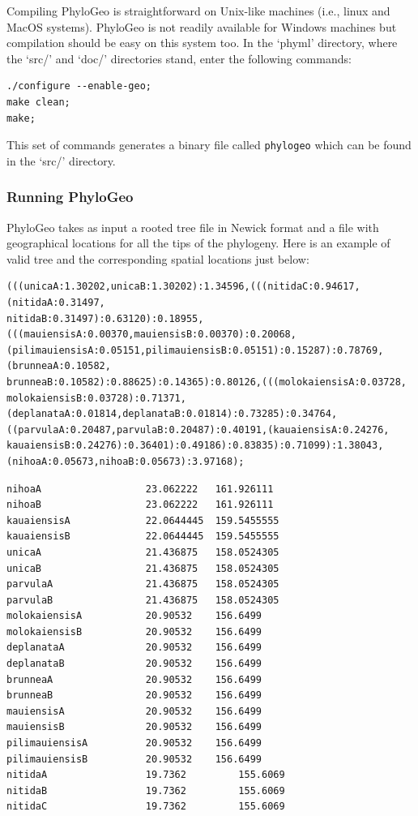 \documentclass[a4paper,12pt]{article}
\newcommand{\x}[1]{\texttt{#1}}
\begin{document}
Compiling PhyloGeo is straightforward on Unix-like  machines (i.e., linux and MacOS systems). PhyloGeo
is not readily available for Windows machines but  compilation should be easy on this system too. In
the `phyml' directory, where the `src/'  and `doc/' directories stand, enter the following commands:
{\setlength{\baselineskip}{0.5\baselineskip}
\begin{verbatim}
./configure --enable-geo;
make clean;
make;
\end{verbatim} } This set of commands generates  a binary file called \x{phylogeo} which can be found
  in the `src/' directory.

\subsubsection{Running PhyloGeo} PhyloGeo takes as input a rooted tree file in Newick format and a file
with geographical locations for all the tips of the phylogeny. Here is an example of valid tree and
the corresponding spatial locations just below:


\begin{scriptsize}
\begin{Verbatim}[frame=single, label=Valid PhyloGeo input tree, samepage=true, baselinestretch=0.5]
(((unicaA:1.30202,unicaB:1.30202):1.34596,(((nitidaC:0.94617,(nitidaA:0.31497,
nitidaB:0.31497):0.63120):0.18955,(((mauiensisA:0.00370,mauiensisB:0.00370):0.20068,
(pilimauiensisA:0.05151,pilimauiensisB:0.05151):0.15287):0.78769,(brunneaA:0.10582,
brunneaB:0.10582):0.88625):0.14365):0.80126,(((molokaiensisA:0.03728,
molokaiensisB:0.03728):0.71371,(deplanataA:0.01814,deplanataB:0.01814):0.73285):0.34764,
((parvulaA:0.20487,parvulaB:0.20487):0.40191,(kauaiensisA:0.24276,
kauaiensisB:0.24276):0.36401):0.49186):0.83835):0.71099):1.38043,
(nihoaA:0.05673,nihoaB:0.05673):3.97168);
\end{Verbatim}

\begin{Verbatim}[frame=single, label=Valid PhyloGeo spatial location file, samepage=true, baselinestretch=0.5]
nihoaA                  23.062222	161.926111
nihoaB                  23.062222	161.926111
kauaiensisA             22.0644445	159.5455555
kauaiensisB             22.0644445	159.5455555
unicaA                  21.436875	158.0524305
unicaB                  21.436875	158.0524305
parvulaA                21.436875	158.0524305
parvulaB                21.436875	158.0524305
molokaiensisA           20.90532	156.6499
molokaiensisB           20.90532	156.6499
deplanataA              20.90532	156.6499
deplanataB              20.90532	156.6499
brunneaA                20.90532	156.6499
brunneaB                20.90532	156.6499
mauiensisA              20.90532	156.6499
mauiensisB              20.90532	156.6499
pilimauiensisA          20.90532	156.6499
pilimauiensisB          20.90532	156.6499
nitidaA                 19.7362	        155.6069
nitidaB                 19.7362	        155.6069
nitidaC                 19.7362	        155.6069
\end{Verbatim}
\end{scriptsize}
\end{document}
